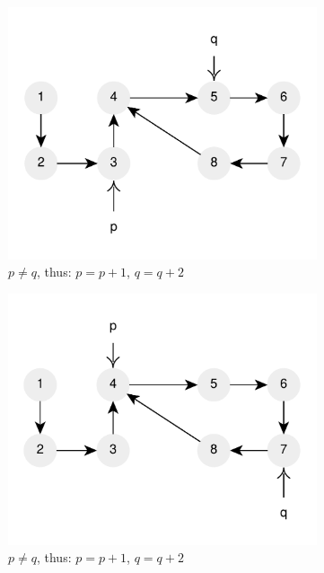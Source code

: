 \begin{figure}
\begin{subfigure}[l]{0.36\textwidth}
		\includegraphics[width=1\linewidth]{sources/cycle_in_list/images/floyd3}
		\caption{$p \neq q$,  thus: $p=p+1$, $q=q+2$}
		\label{fig:cycle_in_list:floyd3}
	 \end{subfigure}
	 \hfill
	 \begin{subfigure}[l]{0.36\textwidth}
		\includegraphics[width=1\linewidth]{sources/cycle_in_list/images/floyd4}
		\caption{$p \neq q$,  thus: $p=p+1$, $q=q+2$}
		\label{fig:cycle_in_list:floyd4}
	 \end{subfigure}
	 \hfill
	 \begin{subfigure}[l]{0.36\textwidth}

\end{subfigure}
\end{figure}
